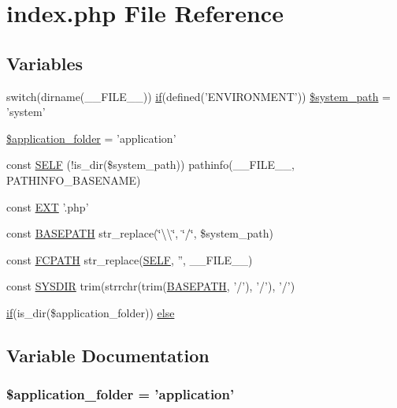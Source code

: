 \hypertarget{index_8php}{\section{index.\-php File Reference}
\label{index_8php}
}
\subsection*{Variables}
\begin{DoxyCompactItemize}
\item 
switch(dirname(\-\_\-\-\_\-\-F\-I\-L\-E\-\_\-\-\_\-)) \hyperlink{bootstrap_8min_8js_afac0f023df4d3c79a9b54c1aae1fbdc3}{if}(defined('E\-N\-V\-I\-R\-O\-N\-M\-E\-N\-T')) \hyperlink{index_8php_ae873e5430c828eb3081abe7050a379b6}{\$system\-\_\-path} = 'system'
\item 
\hyperlink{index_8php_ace4309eda0b92e3260b226079bc17909}{\$application\-\_\-folder} = 'application'
\item 
const \hyperlink{index_8php_a428c045e64680e1582ba74161e441a1c}{S\-E\-L\-F} (!is\-\_\-dir(\$system\-\_\-path)) pathinfo(\-\_\-\-\_\-\-F\-I\-L\-E\-\_\-\-\_\-, P\-A\-T\-H\-I\-N\-F\-O\-\_\-\-B\-A\-S\-E\-N\-A\-M\-E)
\item 
const \hyperlink{index_8php_ad48706cc82e010be85f1398fb34c6510}{E\-X\-T} '.php'
\item 
const \hyperlink{index_8php_ad39801cabfd338dc5524466fe793fda9}{B\-A\-S\-E\-P\-A\-T\-H} str\-\_\-replace(\char`\"{}\textbackslash{}\textbackslash{}\char`\"{}, \char`\"{}/\char`\"{}, \$system\-\_\-path)
\item 
const \hyperlink{index_8php_ae486546e58b2603595efedf9f95b3926}{F\-C\-P\-A\-T\-H} str\-\_\-replace(\hyperlink{index_8php_a428c045e64680e1582ba74161e441a1c}{S\-E\-L\-F}, '', \-\_\-\-\_\-\-F\-I\-L\-E\-\_\-\-\_\-)
\item 
const \hyperlink{index_8php_ab645ae0961792b1f2b4b83f89cb95fa5}{S\-Y\-S\-D\-I\-R} trim(strrchr(trim(\hyperlink{index_8php_ad39801cabfd338dc5524466fe793fda9}{B\-A\-S\-E\-P\-A\-T\-H}, '/'), '/'), '/')
\item 
\hyperlink{bootstrap_8min_8js_afac0f023df4d3c79a9b54c1aae1fbdc3}{if}(is\-\_\-dir(\$application\-\_\-folder)) \hyperlink{index_8php_a949e0a4a1cdea0279f54348f205f993b}{else}
\end{DoxyCompactItemize}


\subsection{Variable Documentation}
\hypertarget{index_8php_ace4309eda0b92e3260b226079bc17909}{
\subsubsection[{\$application\-\_\-folder}]{\setlength{\rightskip}{0pt plus 5cm}\$application\-\_\-folder = 'application'}}\label{index_8php_ace4309eda0b92e3260b226079bc17909}


